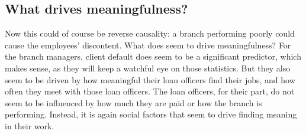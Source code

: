 \documentclass[11pt]{article}
\begin{document}
\pagebreak

\subsection{What drives meaningfulness?}

Now this could of course be reverse causality: a branch performing poorly could cause the employees' discontent. What does seem to drive meaningfulness? For the branch managers, client default does seem to be a significant predictor, which makes sense, as they will keep a watchful eye on those statistics. But they also seem to be driven by how meaningful their loan officers find their jobs, and how often they meet with those loan officers. The loan officers, for their part, do not seem to be influenced by how much they are paid or how the branch is performing. Instead, it is again social factors that seem to drive finding meaning in their work.
\end{document}
